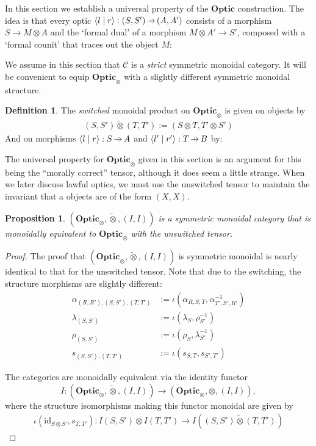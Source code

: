 \documentclass[11pt,a4paper]{article}
\theoremstyle{plain}
\newtheorem{proposition}[theorem]{Proposition}
\theoremstyle{definition}
\newtheorem{definition}[theorem]{Definition}
\newcommand{\C}{\mathscr{C}}
\newcommand{\Optic}{\mathbf{Optic}}
\newcommand{\switched}{\mathbin{\tilde{\otimes}}}
\newcommand{\id}{\mathrm{id}}
\newcommand{\rep}[2]{{\ensuremath \left\langle #1 \mid #2 \right\rangle}}
\newcommand{\hto}{\ensuremath{\,\mathaccent\shortmid\rightarrow\,}}
\begin{document}
In this section we establish a universal property of the $\Optic$ construction. The idea is that every optic $\rep{l}{r} : (S, S') \hto (A, A')$ consists of a morphism $S \to M \otimes A$ and the `formal dual' of a morphism $M \otimes A' \to S'$, composed with a `formal counit' that traces out the object $M$:
\begin{center}
  
\end{center}

We assume in this section that $\C$ is a \emph{strict} symmetric monoidal category. It will be convenient to equip $\Optic_\otimes$ with a slightly different symmetric monoidal structure. 

\begin{definition}
  The \emph{switched} monoidal product on $\Optic_\otimes$ is given on objects by
  \begin{align*}
    (S, S') \switched (T, T') := (S \otimes T, T' \otimes S')
  \end{align*}
  And on morphisms $\rep{l}{r} : S \hto A$ and $\rep{l'}{r'} : T \hto B$ by:
  \begin{center}
    
  \end{center}
\end{definition}

The universal property for $\Optic_\otimes$ given in this section is an argument for this being the ``morally correct'' tensor, although it does seem a little strange. When we later discuss lawful optics, we must use the unswitched tensor to maintain the invariant that a objects are of the form $(X, X)$.

\begin{proposition}
  $(\Optic_\otimes, \switched, (I, I))$ is a symmetric monoidal category that is monoidally equivalent to $\Optic_\otimes$ with the unswitched tensor.
\end{proposition}
\begin{proof}
  The proof that $(\Optic_\otimes, \switched, (I, I))$ is symmetric monoidal is nearly identical to that for the unswitched tensor. Note that due to the switching, the structure morphisms are slightly different:
  \begin{align*}
    \alpha_{(R, R'), (S, S'), (T, T')} &:= \iota(\alpha_{R,S,T}, \alpha_{T',S',R'}^{-1}) \\
    \lambda_{(S, S')} &:= \iota(\lambda_{S}, \rho_{S'}^{-1}) \\
    \rho_{(S, S')} &:= \iota(\rho_{S}, \lambda_{S'}^{-1}) \\
    s_{(S, S'), (T, T')} &:= \iota(s_{S, T}, s_{S', T'})
  \end{align*}

  The categories are monoidally equivalent via the identity functor \[I : (\Optic_\otimes, \switched, (I, I)) \to (\Optic_\otimes, \otimes, (I, I)),\] where the structure isomorphisms making this functor monoidal are given by
  \begin{align*}
    \iota(\id_{S \otimes S'}, s_{T, T'}) : I(S, S') \otimes I(T, T') \to I((S, S') \switched (T, T'))
  \end{align*}

\end{proof}
\end{document}

